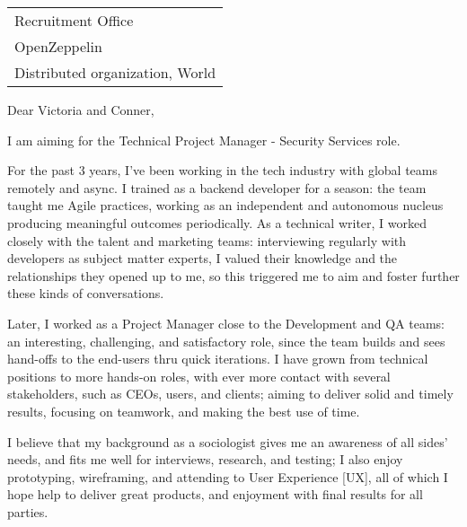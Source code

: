 \begin{tabular}{@{} l}
    Recruitment Office \\
    OpenZeppelin \\
    Distributed organization, World
\end{tabular}

\bigskip %


Dear Victoria and Conner,
\bigskip %


I am aiming for the %
Technical Project Manager - Security Services role.

For the past 3 years, I've been working in the tech industry with global teams remotely and async. 
I trained as a backend developer for a season: 
the team taught me Agile practices, working as an independent and autonomous nucleus
producing meaningful outcomes periodically.
As a technical writer, I worked closely with the talent and marketing teams:
interviewing regularly with developers as subject matter experts,
I valued their knowledge and the relationships they opened up to me,
so this triggered me to aim and foster further these kinds of conversations.

Later, I worked as a Project Manager close to the Development and QA teams:
an interesting, challenging, and satisfactory role, 
since the team builds and sees 
hand-offs to the end-users thru quick iterations.
I have grown from technical positions to more hands-on roles, with ever more contact 
with several stakeholders, such as CEOs, users, and clients; 
aiming to deliver solid and timely results, 
focusing on teamwork, 
and making the best use of time.

I believe that my background 
as a sociologist gives me an awareness of all sides' needs, 
and fits me well for interviews, research, and testing;
I also enjoy prototyping, wireframing, and attending to User Experience [UX], 
all of which I hope help to deliver great products, and enjoyment with final results for all parties.


